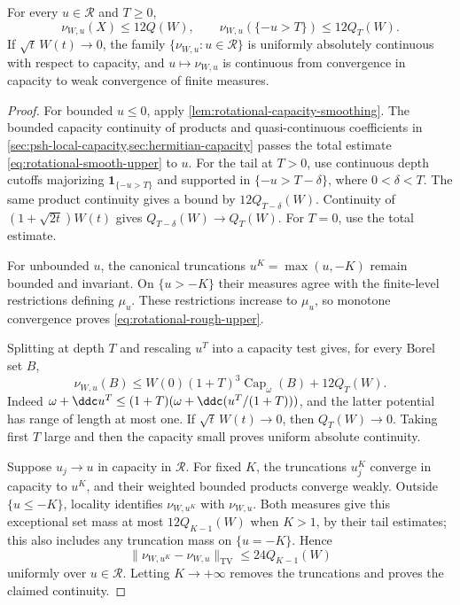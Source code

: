 \begin{proposition}\label{prop:rotational-weighted-upper}
For every $u\in\mathcal R$ and $T\geq0$,
\begin{equation}\label{eq:rotational-rough-upper}
 \nu_{W,u}(X)\leq12Q(W),\qquad
 \nu_{W,u}(\{-u>T\})\leq12Q_T(W).
\end{equation}
If $\sqrt t\,W(t)\to0$, the family $\{\nu_{W,u}:u\in\mathcal R\}$ is uniformly absolutely continuous with respect to capacity, and $u\mapsto\nu_{W,u}$ is continuous from convergence in capacity to weak convergence of finite measures.
\end{proposition}
\begin{proof}
For bounded $u\leq0$, apply \cref{lem:rotational-capacity-smoothing}. The bounded capacity continuity of products and quasi-continuous coefficients in \cref{sec:psh-local-capacity,sec:hermitian-capacity} passes the total estimate \eqref{eq:rotational-smooth-upper} to $u$. For the tail at $T>0$, use continuous depth cutoffs majorizing $\mathbf1_{\{-u>T\}}$ and supported in $\{-u>T-\delta\}$, where $0<\delta<T$. The same product continuity gives a bound by $12Q_{T-\delta}(W)$. Continuity of $(1+\sqrt{2t})W(t)$ gives $Q_{T-\delta}(W)\to Q_T(W)$. For $T=0$, use the total estimate.

For unbounded $u$, the canonical truncations $u^K=\max(u,-K)$ remain bounded and invariant. On $\{u>-K\}$ their measures agree with the finite-level restrictions defining $\mu_u$. These restrictions increase to $\mu_u$, so monotone convergence proves \eqref{eq:rotational-rough-upper}.

Splitting at depth $T$ and rescaling $u^T$ into a capacity test gives, for every Borel set $B$,
\begin{equation}\label{eq:rotational-uniform-ac}
 \nu_{W,u}(B)\leq W(0)(1+T)^3\operatorname{Cap}_\omega(B)+12Q_T(W).
\end{equation}
Indeed $\omega+\ddc u^T\leq(1+T)(\omega+\ddc(u^T/(1+T)))$, and the latter potential has range of length at most one. If $\sqrt t\,W(t)\to0$, then $Q_T(W)\to0$. Taking first $T$ large and then the capacity small proves uniform absolute continuity.

Suppose $u_j\to u$ in capacity in $\mathcal R$. For fixed $K$, the truncations $u_j^K$ converge in capacity to $u^K$, and their weighted bounded products converge weakly. Outside $\{u\leq-K\}$, locality identifies $\nu_{W,u^K}$ with $\nu_{W,u}$. Both measures give this exceptional set mass at most $12Q_{K-1}(W)$ when $K>1$, by their tail estimates; this also includes any truncation mass on $\{u=-K\}$. Hence
\[
 \|\nu_{W,u^K}-\nu_{W,u}\|_{\mathrm{TV}}\leq24Q_{K-1}(W)
\]
uniformly over $u\in\mathcal R$. Letting $K\to+\infty$ removes the truncations and proves the claimed continuity.
\end{proof}

